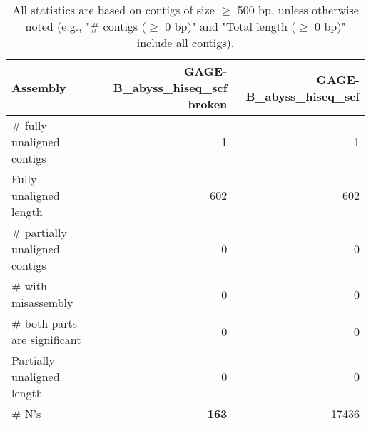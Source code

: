 \documentclass[12pt,a4paper]{article}
\begin{document}
\begin{table}[ht]
\begin{center}
\caption{All statistics are based on contigs of size $\geq$ 500 bp, unless otherwise noted (e.g., "\# contigs ($\geq$ 0 bp)" and "Total length ($\geq$ 0 bp)" include all contigs).}
\begin{tabular}{|l*{2}{|r}|}
\hline
Assembly & GAGE-B\_abyss\_hiseq\_scf broken & GAGE-B\_abyss\_hiseq\_scf \\ \hline
\# fully unaligned contigs & 1 & 1 \\ \hline
Fully unaligned length & 602 & 602 \\ \hline
\# partially unaligned contigs & 0 & 0 \\ \hline
\hspace{5mm}\# with misassembly & 0 & 0 \\ \hline
\hspace{5mm}\# both parts are significant & 0 & 0 \\ \hline
Partially unaligned length & 0 & 0 \\ \hline
\# N's & {\bf 163} & 17436 \\ \hline
\end{tabular}
\end{center}
\end{table}
\end{document}
